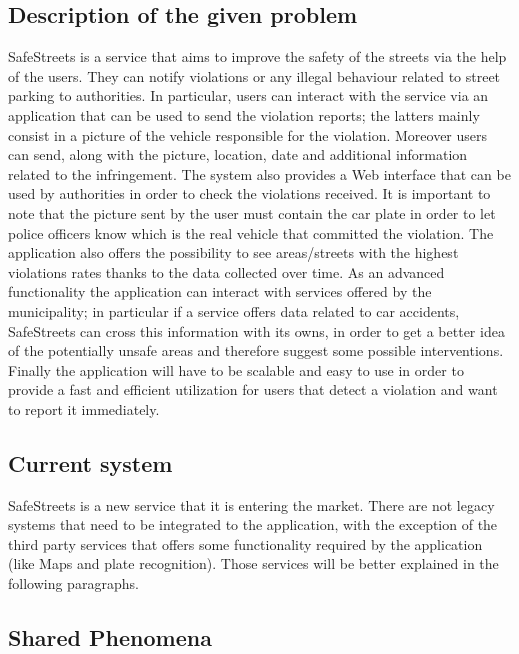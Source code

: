 \subsection{Description of the given problem}
SafeStreets is a service that aims to improve the safety of the streets via the help of the users. They can notify violations or any illegal behaviour related to street parking to authorities. In particular, users can interact with the service via an application that can be used to send the violation reports; the latters mainly consist in a picture of the vehicle responsible for the violation. Moreover users can send, along with the picture, location, date and additional information related to the infringement. The system also provides a Web interface that can be used by authorities in order to check the violations received. It is important to note that the picture sent by the user must contain the car plate in order to let police officers know which is the real vehicle that committed the violation. The application also offers the possibility to see areas/streets with the highest violations rates thanks to the data collected over time. As an advanced functionality the application can interact with services offered by the municipality; in particular if a service offers data related to car accidents, SafeStreets can cross this information with its owns, in order to get a better idea of the potentially unsafe areas and therefore suggest some possible interventions. Finally the application will have to be scalable and easy to use in order to provide a fast and efficient utilization for users that detect a violation and want to report it immediately.

\subsection{Current system}
SafeStreets is a new service that it is entering the market. There are not legacy systems that need to be integrated to the application, with the exception of the third party services that offers some functionality required by the application (like Maps and plate recognition). Those services will be better explained in the following paragraphs.


\subsection{Shared Phenomena}


